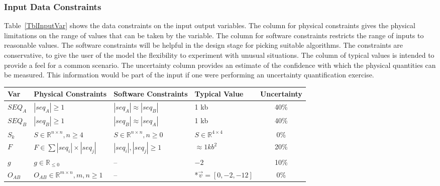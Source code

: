 \documentclass[12pt]{article}
\begin{document}

\subsubsection{Input Data Constraints} \label{sec_DataConstraints}    

Table~\ref{TblInputVar} shows the data constraints on the input output
variables.  The column for physical constraints gives the physical limitations
on the range of values that can be taken by the variable.  The column for
software constraints restricts the range of inputs to reasonable values.  The
software constraints will be helpful in the design stage for picking suitable
algorithms.  The constraints are conservative, to give the user of the model the
flexibility to experiment with unusual situations.  The column of typical values
is intended to provide a feel for a common scenario.  The uncertainty column
provides an estimate of the confidence with which the physical quantities can be
measured.  This information would be part of the input if one were performing an
uncertainty quantification exercise.


\begin{table}[!h]
  \caption{Input Variables} \label{TblInputVar}
  \renewcommand{\arraystretch}{1.2}
\noindent \begin{longtable*}{l l l l c} 
  \toprule
  \textbf{Var} & \textbf{Physical Constraints} & \textbf{Software Constraints} &
                             \textbf{Typical Value} & \textbf{Uncertainty}\\
  \midrule 
  $SEQ_A$ & $|{seq_A}| \geq 1$ & $|seq_A| \approx |seq_B|$ & 1 kb & 40\%
  \\
  $SEQ_B$ & $|{seq_B}| \geq 1$ & $|seq_B| \approx |seq_A|$ & 1 kb & 40\%
  \\
  $S_k$ & $S \in \mathbb{R}^{n \times n}, n \geq 4$ & $S \in \mathbb{R}^{n \times n}, n \geq 0$ & $S \in \mathbb{R}^{4 \times 4}$& 0\%
  \\
  $F$ & $F \in \sum|seq_i| \times |seq_j|$ & $|seq_i|, |seq_j| \geq 1$ & $\approx 1 kb^2$ & 20\%
  \\
  $g$ & $g \in \mathbb{R}_{\leq 0}$ & -- & $-2$ & 10\%
  \\
  $O_{AB}$ & $O_{AB} \in \mathbb{R}^{m \times n}, m,n \geq 1$ & -- & *$\vec{v} = [0,-2,-12]$ & 0\%
  \\
  \bottomrule
\end{longtable*}
\end{table}
\end{document}
